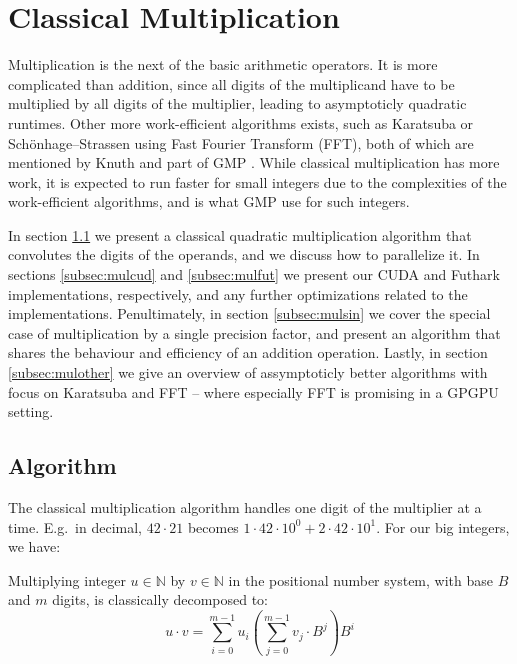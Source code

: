 \section{Classical Multiplication}
\label{sec:mul}

Multiplication is the next of the basic arithmetic operators. It is more
complicated than addition, since all digits of the multiplicand have to be
multiplied by all digits of the multiplier, leading to asymptoticly quadratic
runtimes. Other more work-efficient algorithms exists, such as Karatsuba or
Schönhage–Strassen using Fast Fourier Transform (FFT), both of which are
mentioned by Knuth and part of GMP \cite{knuth97,GMP}. While classical
multiplication has more work, it is expected to run faster for small integers
due to the complexities of the work-efficient algorithms, and is what GMP use
for such integers. %

In section \ref{subsec:mulalg} we present a classical quadratic multiplication
algorithm that convolutes the digits of the operands, and we discuss how to
parallelize it. In sections \ref{subsec:mulcud} and \ref{subsec:mulfut} we
present our CUDA and Futhark implementations, respectively, and any further
optimizations related to the implementations. Penultimately, in section
\ref{subsec:mulsin} we cover the special case of multiplication by a single
precision factor, and present an algorithm that shares the behaviour and
efficiency of an addition operation. Lastly, in section \ref{subsec:mulother} we
give an overview of assymptoticly better algorithms with focus on Karatsuba and
FFT -- where especially FFT is promising in a GPGPU setting.

\subsection{Algorithm}
\label{subsec:mulalg}

The classical multiplication algorithm handles one digit of the multiplier at a
time. E.g.\ in decimal, $42\cdot 21$ becomes
$1 \cdot 42 \cdot 10^{0} + 2 \cdot 42 \cdot 10^{1}$. For our big integers, we have:

\begin{definition}\label{def:clasmul}
  Multiplying integer $u\in \mathbb{N}$ by $v \in \mathbb{N}$ in the positional number system, with
  base $B$ and $m$ digits, is classically decomposed to:
\begin{equation}
  \label{eq:clasmul0}
  u \cdot v = \sum_{i=0}^{m-1}u_i\left( \sum_{j=0}^{m-1}v_j\cdot B^{j} \right)B^{i}
\end{equation}
\end{definition}


